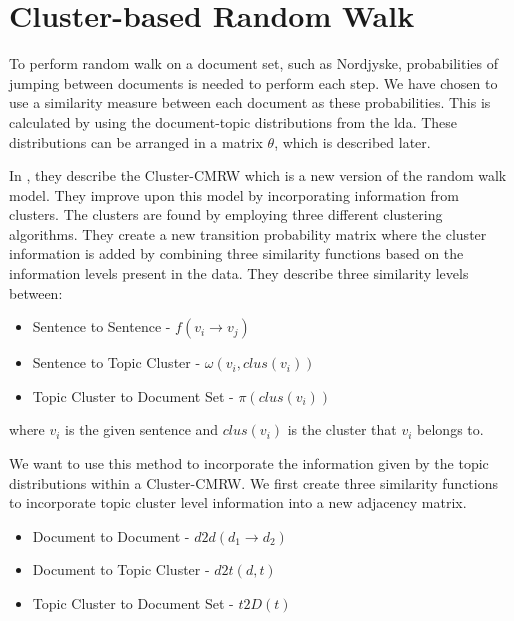 \section{Cluster-based Random Walk}\label{sec:cluster_pagerank}
To perform random walk on a document set, such as Nordjyske, probabilities of jumping between documents is needed to perform each step.
We have chosen to use a similarity measure between each document as these probabilities.
This is calculated by using the document-topic distributions from the \gls{lda}.
These distributions can be arranged in a matrix $\theta$, which is described later.

In \cite{ClusterPageRank}, they describe the \gls{Cluster-CMRW} which is a new version of the random walk model. 
They improve upon this model by incorporating information from clusters. 
The clusters are found by employing three different clustering algorithms.
They create a new transition probability matrix where the cluster information is added by combining three similarity functions based on the information levels present in the data.
They describe three similarity levels between:
\begin{itemize}
    \item Sentence to Sentence - $f(v_i \rightarrow v_j)$
    \item Sentence to Topic Cluster - $\omega(v_i, clus(v_i))$
    \item Topic Cluster to Document Set - $\pi(clus(v_i))$
\end{itemize}
where $v_i$ is the given sentence and $clus(v_i)$ is the cluster that $v_i$ belongs to.

We want to use this method to incorporate the information given by the topic distributions within a \gls{Cluster-CMRW}. 
We first create three similarity functions to incorporate topic cluster level information into a new adjacency matrix.
\begin{itemize}
    \item Document to Document - $d2d(d_1 \rightarrow d_2)$
    \item Document to Topic Cluster - $d2t(d,t)$
    \item Topic Cluster to Document Set - $t2D(t)$
\end{itemize}

